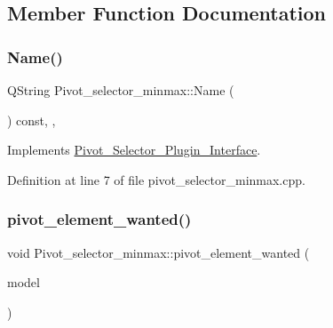 \subsection{Member Function Documentation}
\mbox{\label{classPivot__selector__minmax_a9df8c5a5f3a0cf1f9c97ee8d8ad68b1b}} 
\subsubsection{\texorpdfstring{Name()}{Name()}}
{\footnotesize\ttfamily Q\+String Pivot\+\_\+selector\+\_\+minmax\+::\+Name (\begin{DoxyParamCaption}{ }\end{DoxyParamCaption}) const\hspace{0.3cm}{\ttfamily [override]}, {\ttfamily [private]}, {\ttfamily [virtual]}}



Implements \hyperlink{classPivot__Selector__Plugin__Interface_a35b4215e27a169edc2260f2e578de184}{Pivot\+\_\+\+Selector\+\_\+\+Plugin\+\_\+\+Interface}.



Definition at line 7 of file pivot\+\_\+selector\+\_\+minmax.\+cpp.

\mbox{\label{classPivot__selector__minmax_ae47a96737d527fa40d1ee6608caf9bf3}} 
\subsubsection{\texorpdfstring{pivot\+\_\+element\+\_\+wanted()}{pivot\_element\_wanted()}}
{\footnotesize\ttfamily void Pivot\+\_\+selector\+\_\+minmax\+::pivot\+\_\+element\+\_\+wanted (\begin{DoxyParamCaption}\item[{Q\+Standard\+Item\+Model $\ast$}]{model }\end{DoxyParamCaption})\hspace{0.3cm}{\ttfamily [virtual]}}




